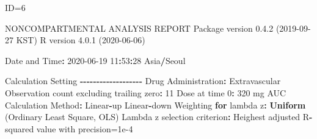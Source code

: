 \documentclass[
  10pt,
]{krantz}
\makeatletter
\newenvironment{Shaded}{\begin{snugshade}}{\end{snugshade}}
\newcommand{\ControlFlowTok}[1]{\textcolor[rgb]{0.13,0.29,0.53}{\textbf{#1}}}
\newcommand{\DecValTok}[1]{\textcolor[rgb]{0.00,0.00,0.81}{#1}}
\newcommand{\FloatTok}[1]{\textcolor[rgb]{0.00,0.00,0.81}{#1}}
\newcommand{\KeywordTok}[1]{\textcolor[rgb]{0.13,0.29,0.53}{\textbf{#1}}}
\newcommand{\NormalTok}[1]{#1}
\newcommand{\OperatorTok}[1]{\textcolor[rgb]{0.81,0.36,0.00}{\textbf{#1}}}
\newcommand{\StringTok}[1]{\textcolor[rgb]{0.31,0.60,0.02}{#1}}
\newenvironment{kframe}{%
\medskip{}
\setlength{\fboxsep}{.8em}
 \def\at@end@of@kframe{}%
 \ifinner\ifhmode%
  \def\at@end@of@kframe{\end{minipage}}%
  \begin{minipage}{\columnwidth}%
 \fi\fi%
 \def\FrameCommand##1{\hskip\@totalleftmargin \hskip-\fboxsep
 \colorbox{shadecolor}{##1}\hskip-\fboxsep
     \hskip-\linewidth \hskip-\@totalleftmargin \hskip\columnwidth}%
 \MakeFramed {\advance\hsize-\width
   \@totalleftmargin\z@ \linewidth\hsize
   \@setminipage}}%
 {\par\unskip\endMakeFramed%
 \at@end@of@kframe}
\renewenvironment{Shaded}{\begin{kframe}}{\end{kframe}}
\makeatother
\begin{document}
\begin{Shaded}
\begin{Highlighting}[]
\NormalTok{ID=}\DecValTok{6}

\NormalTok{                        NONCOMPARTMENTAL ANALYSIS REPORT}
\NormalTok{                       Package version }\DecValTok{0}\NormalTok{.}\FloatTok{4.2}\NormalTok{ (}\DecValTok{2019{-}09{-}27}\NormalTok{ KST)}
\NormalTok{                          R version }\DecValTok{4}\NormalTok{.}\FloatTok{0.1}\NormalTok{ (}\DecValTok{2020{-}06{-}06}\NormalTok{)}

\NormalTok{Date and Time}\OperatorTok{:}\StringTok{ }\DecValTok{2020{-}06{-}19} \DecValTok{11}\OperatorTok{:}\DecValTok{53}\OperatorTok{:}\DecValTok{28}\NormalTok{ Asia}\OperatorTok{/}\NormalTok{Seoul}

\NormalTok{Calculation Setting}
\OperatorTok{{-}{-}{-}{-}{-}{-}{-}{-}{-}{-}{-}{-}{-}{-}{-}{-}{-}{-}{-}}
\NormalTok{Drug Administration}\OperatorTok{:}\StringTok{ }\NormalTok{Extravascular}
\NormalTok{Observation count excluding trailing zero}\OperatorTok{:}\StringTok{ }\DecValTok{11}
\NormalTok{Dose at time }\DecValTok{0}\OperatorTok{:}\StringTok{ }\DecValTok{320}\NormalTok{ mg}
\NormalTok{AUC Calculation Method}\OperatorTok{:}\StringTok{ }\NormalTok{Linear}\OperatorTok{{-}}\NormalTok{up Linear}\OperatorTok{{-}}\NormalTok{down}
\NormalTok{Weighting }\ControlFlowTok{for}\NormalTok{ lambda z}\OperatorTok{:}\StringTok{ }\KeywordTok{Uniform}\NormalTok{ (Ordinary Least Square, OLS)}
\NormalTok{Lambda z selection criterion}\OperatorTok{:}\StringTok{ }\NormalTok{Heighest adjusted R}\OperatorTok{{-}}\NormalTok{squared value with precision=}\FloatTok{1e{-}4}



\end{Highlighting}
\end{Shaded}
\end{document}

